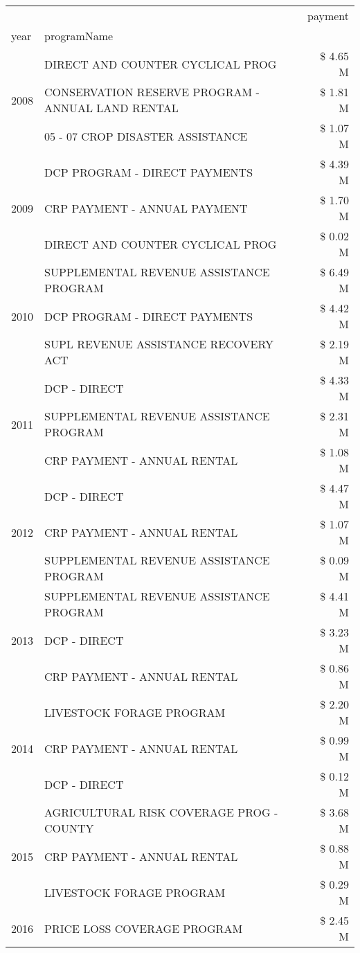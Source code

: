 \begin{tabular}{llr}
\toprule
 &  & payment \\
year & programName &  \\
\midrule
\multirow[t]{3}{*}{2008} & DIRECT AND COUNTER CYCLICAL PROG & \$ 4.65 M \\
 & CONSERVATION RESERVE PROGRAM - ANNUAL LAND RENTAL & \$ 1.81 M \\
 & 05 - 07 CROP DISASTER ASSISTANCE & \$ 1.07 M \\
\cline{1-3}
\multirow[t]{3}{*}{2009} & DCP PROGRAM - DIRECT PAYMENTS & \$ 4.39 M \\
 & CRP PAYMENT - ANNUAL PAYMENT & \$ 1.70 M \\
 & DIRECT AND COUNTER CYCLICAL PROG & \$ 0.02 M \\
\cline{1-3}
\multirow[t]{3}{*}{2010} & SUPPLEMENTAL REVENUE ASSISTANCE PROGRAM & \$ 6.49 M \\
 & DCP PROGRAM - DIRECT PAYMENTS & \$ 4.42 M \\
 & SUPL REVENUE ASSISTANCE RECOVERY ACT & \$ 2.19 M \\
\cline{1-3}
\multirow[t]{3}{*}{2011} & DCP - DIRECT & \$ 4.33 M \\
 & SUPPLEMENTAL REVENUE ASSISTANCE PROGRAM & \$ 2.31 M \\
 & CRP PAYMENT - ANNUAL RENTAL & \$ 1.08 M \\
\cline{1-3}
\multirow[t]{3}{*}{2012} & DCP - DIRECT & \$ 4.47 M \\
 & CRP PAYMENT - ANNUAL RENTAL & \$ 1.07 M \\
 & SUPPLEMENTAL REVENUE ASSISTANCE PROGRAM & \$ 0.09 M \\
\cline{1-3}
\multirow[t]{3}{*}{2013} & SUPPLEMENTAL REVENUE ASSISTANCE PROGRAM & \$ 4.41 M \\
 & DCP - DIRECT & \$ 3.23 M \\
 & CRP PAYMENT - ANNUAL RENTAL & \$ 0.86 M \\
\cline{1-3}
\multirow[t]{3}{*}{2014} & LIVESTOCK FORAGE PROGRAM & \$ 2.20 M \\
 & CRP PAYMENT - ANNUAL RENTAL & \$ 0.99 M \\
 & DCP - DIRECT & \$ 0.12 M \\
\cline{1-3}
\multirow[t]{3}{*}{2015} & AGRICULTURAL RISK COVERAGE PROG - COUNTY & \$ 3.68 M \\
 & CRP PAYMENT - ANNUAL RENTAL & \$ 0.88 M \\
 & LIVESTOCK FORAGE PROGRAM & \$ 0.29 M \\
\cline{1-3}
\multirow[t]{3}{*}{2016} & PRICE LOSS COVERAGE PROGRAM & \$ 2.45 M \\

\end{tabular}
